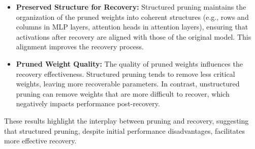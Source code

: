 \begin{itemize}
    \item {\textbf{Preserved Structure for Recovery:} Structured pruning maintains the organization of the pruned weights into coherent structures (e.g., rows and columns in MLP layers, attention heads in attention layers), ensuring that activations after recovery are aligned with those of the original model. This alignment improves the recovery process.}
    \item {\textbf{Pruned Weight Quality:} The quality of pruned weights influences the recovery effectiveness. Structured pruning tends to remove less critical weights, leaving more recoverable parameters. In contrast, unstructured pruning can remove weights that are more difficult to recover, which negatively impacts performance post-recovery.}
\end{itemize}

{These results highlight the interplay between pruning and recovery, suggesting that structured pruning, despite initial performance disadvantages, facilitates more effective recovery.}









